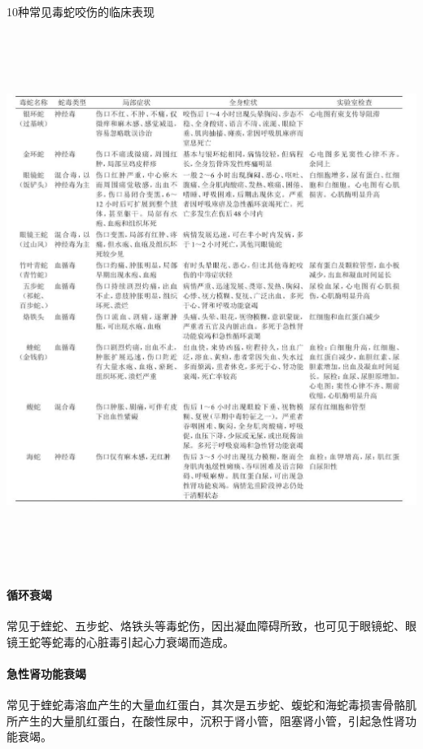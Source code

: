 \begin{table}[htbp]
\centering
\caption{10种常见毒蛇咬伤的临床表现}
\label{tab60-3}
\includegraphics[width=6.83333in,height=6.86458in]{./images/Image00230.jpg}
\end{table}

\paragraph{循环衰竭}

常见于蝰蛇、五步蛇、烙铁头等毒蛇伤，因出凝血障碍所致，也可见于眼镜蛇、眼镜王蛇等蛇毒的心脏毒引起心力衰竭而造成。

\paragraph{急性肾功能衰竭}

常见于蝰蛇毒溶血产生的大量血红蛋白，其次是五步蛇、蝮蛇和海蛇毒损害骨骼肌所产生的大量肌红蛋白，在酸性尿中，沉积于肾小管，阻塞肾小管，引起急性肾功能衰竭。

